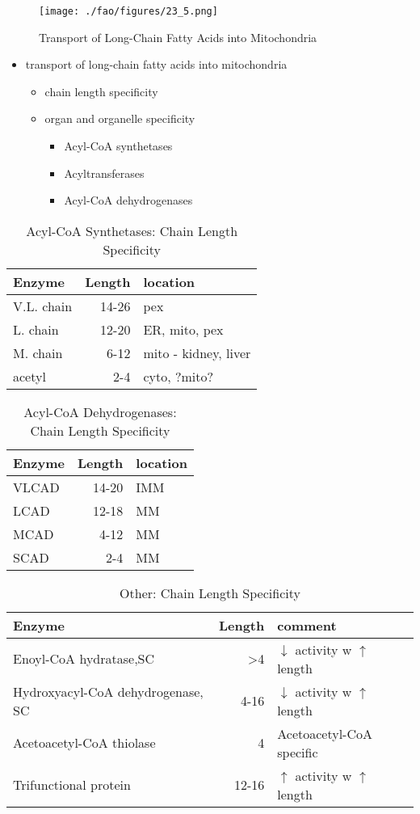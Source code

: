 \documentclass{scrartcl}
\begin{document}
\begin{figure}[htbp]
\centering
\texttt{[image: ./fao/figures/23\_5.png]}
\caption{\label{fig:org6bc0c62}
Transport of Long-Chain Fatty Acids into Mitochondria}
\end{figure}
\begin{itemize}
\item transport of long-chain fatty acids into mitochondria
\begin{itemize}
\item chain length specificity
\item organ and organelle specificity
\begin{itemize}
\item Acyl-CoA synthetases
\item Acyltransferases
\item Acyl-CoA dehydrogenases
\end{itemize}
\end{itemize}
\end{itemize}


\begin{table}[htbp]
\caption{\label{tab:org3897106}
Acyl-CoA Synthetases: Chain Length Specificity}
\centering
\begin{tabular}{lrl}
Enzyme & Length & location\\
\hline
V.L. chain & 14-26 & pex\\
L. chain & 12-20 & ER, mito, pex\\
M. chain & 6-12 & mito - kidney, liver\\
acetyl & 2-4 & cyto, ?mito?\\
\end{tabular}
\end{table}


\begin{table}[htbp]
\caption{\label{tab:orgbf903eb}
Acyl-CoA Dehydrogenases: Chain Length Specificity}
\centering
\begin{tabular}{lrl}
Enzyme & Length & location\\
\hline
VLCAD & 14-20 & IMM\\
LCAD & 12-18 & MM\\
MCAD & 4-12 & MM\\
SCAD & 2-4 & MM\\
\end{tabular}
\end{table}


\begin{table}[htbp]
\caption{\label{tab:orgf476cd2}
Other: Chain Length Specificity}
\centering
\begin{tabular}{lrl}
Enzyme & Length & comment\\
\hline
Enoyl-CoA hydratase,SC & >4 & \(\downarrow\) activity w \(\uparrow\) length\\
Hydroxyacyl-CoA dehydrogenase, SC & 4-16 & \(\downarrow\) activity w \(\uparrow\) length\\
Acetoacetyl-CoA thiolase & 4 & Acetoacetyl-CoA specific\\
Trifunctional protein & 12-16 & \(\uparrow\) activity w \(\uparrow\) length\\
\end{tabular}
\end{table}
\end{document}
